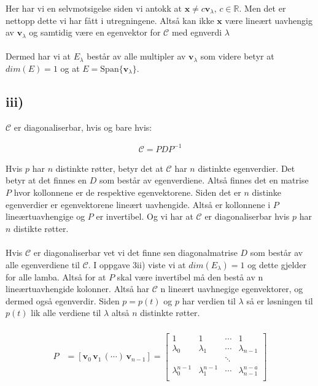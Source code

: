 \documentclass[a4paper, norsk, twoside, 10pt]{article}
\begin{document}
\begin{flushleft}
  Her har vi en selvmotsigelse siden vi antokk at $\mathbf{x}  \neq c\mathbf{v}_{\lambda}, \, c \in \mathbb{R}$. Men det er nettopp dette vi har fått i utregningene. Altså kan ikke $\mathbf{x}$ være lineært uavhengig av $\mathbf{v}_{\lambda}$ og samtidig være en egenvektor for $\mathcal{C}$ med egnverdi $\lambda$  \\ \ \\

  Dermed har vi at $E_{\lambda}$ består av alle multipler av $\mathbf{v}_{\lambda}$ som videre betyr at $dim(E) = 1$ og at $E = \text{Span}\{\mathbf{v}_{\lambda}\}$.


  \subsection*{iii)}

  $\mathcal{C}$ er diagonaliserbar, hvis og bare hvis:

  \begin{align*}
    \mathcal{C} = PDP^{-1}
  \end{align*}

  Hvis $p$ har $n$ distinkte røtter, betyr det at $\mathcal{C}$ har $n$ distinkte egenverdier. Det betyr at det finnes en $D$ som består av egenverdiene. Altså finnes det en matrise $P$ hvor kollonnene er de respektive egenvektorene. Siden det er $n$ distinke egenverdier er egenvektorene lineært uavhengide. Altså er kollonnene i $P$ lineærtuavhengige og $P$ er invertibel. Og vi har at $\mathcal{C}$ er diagonaliserbar hvis $p$ har $n$ distikte røtter.
  \\ \ \\
  Hvis $\mathcal{C}$ er diagonaliserbar vet vi det finne sen diagonalmatrise $D$ som består av alle egenverdiene til $\mathcal{C}$. I oppgave 3ii) viste vi at $dim(E_{\lambda}) = 1$ og dette gjelder for alle lamba. Altså for at $P$ skal være invertibel må den bestå av n lineærtuavhengide kolonner. Altså har $\mathcal{C}$ n lineært uavhnegige egenvektorer, og dermed også egenverdir. Siden $p = p(t)$ og $p$ har verdien til $\lambda$ så er løsningen til $p(t)$ lik alle verdiene til $\lambda$ altså $n$ distinkte røtter.
  \\ \ \\
  \begin{align*}
    P &= [\mathbf{v}_{0} \, \mathbf{v}_{1} \, (\cdots) \, \mathbf{v}_{n-1} ]  =
    \begin{bmatrix}
      1 & 1  & \cdots & 1 \\
      \lambda_0 & \lambda_1 & \cdots & \lambda_{n-1} \\
      & & \ddots& \\
      \lambda^{n-1}_{0} & \lambda^{n-1}_{1} & \cdots & \lambda^{n-a}_{n-1} \\
    \end{bmatrix}\\
  \end{align*}


\end{flushleft}
\end{document}
